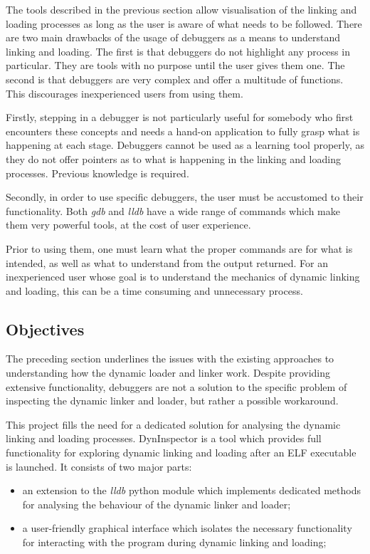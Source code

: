 The tools described in the previous section allow visualisation of the linking and loading processes as long as the user is aware of what needs to be followed. There are two main drawbacks of the usage of debuggers as a means to understand linking and loading. The first is that debuggers do not highlight any process in particular. They are tools with no purpose until the user gives them one. The second is that debuggers are very complex and offer a multitude of functions. This discourages inexperienced users from using them.

Firstly, stepping in a debugger is not particularly useful for somebody who first encounters these concepts and needs a hand-on application to fully grasp what is happening at each stage. Debuggers cannot be used as a learning tool properly, as they do not offer pointers as to what is happening in the linking and loading processes. Previous knowledge is required.

Secondly, in order to use specific debuggers, the user must be accustomed to their functionality. Both \textit{gdb} and \textit{lldb} have a wide range of commands which make them very powerful tools, at the cost of user experience.

Prior to using them, one must learn what the proper commands are for what is intended, as well as what to understand from the output returned. For an inexperienced user whose goal is to understand the mechanics of dynamic linking and loading, this can be a time consuming and unnecessary process.

\subsection{Objectives}

The preceding section underlines the issues with the existing approaches to understanding how the dynamic loader and linker work. Despite providing extensive functionality, debuggers are not a solution to the specific problem of inspecting the dynamic linker and loader, but rather a possible workaround. 

This project fills the need for a dedicated solution for analysing the dynamic linking and loading processes. DynInspector is a tool which provides full functionality for exploring dynamic linking and loading after an ELF executable is launched. It consists of two major parts:
\begin{itemize}
  \item an extension to the \textit{lldb} python module which implements dedicated methods for analysing the behaviour of the dynamic linker and loader;
  \item a user-friendly graphical interface which isolates the necessary functionality for interacting with the program during dynamic linking and loading;
\end{itemize}

